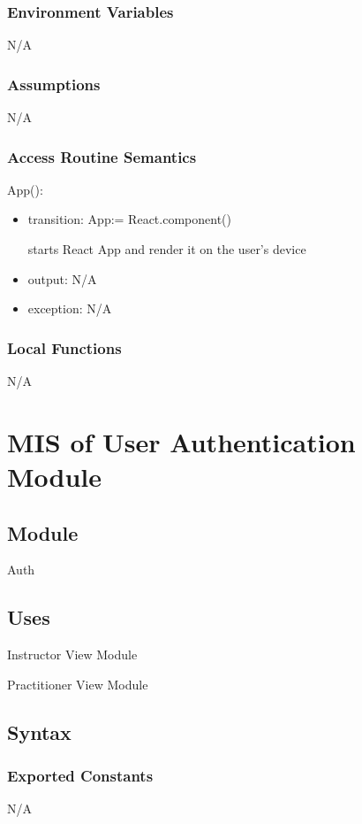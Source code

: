 \documentclass[12pt, titlepage]{article}
\begin{document}
\subsubsection{Environment Variables}
N/A

\subsubsection{Assumptions}
N/A

\subsubsection{Access Routine Semantics}

\noindent App():
\begin{itemize}
\item transition: App:= React.component()

  starts React App and render it on the user's device
\item output: N/A
\item exception: N/A
\end{itemize}

\subsubsection{Local Functions}
N/A

\section{MIS of User Authentication Module} \label{sec:userauth}

\subsection{Module}
Auth

\subsection{Uses}
Instructor View Module

Practitioner View Module

\subsection{Syntax}

\subsubsection{Exported Constants}
N/A
\end{document}
